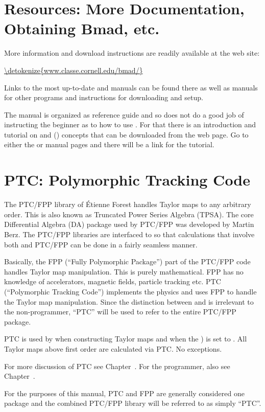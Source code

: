 \section{Resources: More Documentation, Obtaining Bmad, etc.}
\label{s:bmad.web}

More information and download instructions are readily available at the \bmad web site:
\begin{example}
  \url{\detokenize{www.classe.cornell.edu/bmad/}}
\end{example}
Links to the most up-to-date \bmad and \tao manuals can be found there as well as manuals for other
programs and instructions for downloading and setup.

The \bmad manual is organized as reference guide and so does not do a good job of instructing the
beginner as to how to use \bmad. For that there is an introduction and tutorial on \bmad and \tao
() concepts that can be downloaded from the \bmad web page. Go to either the \bmad or
\tao manual pages and there will be a link for the tutorial.

\section{PTC: Polymorphic Tracking Code}
\label{s:ptc.intro}

The PTC/FPP library of \'Etienne Forest handles Taylor maps to any arbitrary order. This is also
known as Truncated Power Series Algebra (TPSA). The core Differential Algebra (DA) package used by
PTC/FPP was developed by Martin Berz\cite{b:berz}. The PTC/FPP libraries are interfaced to \bmad so
that calculations that involve both \bmad and PTC/FPP can be done in a fairly seamless manner.

Basically, the FPP (``Fully Polymorphic Package'') part of the PTC/FPP code handles Taylor map
manipulation. This is purely mathematical. FPP has no knowledge of accelerators, magnetic fields,
particle tracking etc. PTC (``Polymorphic Tracking Code'') implements the physics and uses FPP to
handle the Taylor map manipulation. Since the distinction between  and  is
irrelevant to the non-programmer, ``PTC'' will be used to refer to the entire PTC/FPP package.

PTC is used by \bmad when constructing Taylor maps and when the 
) is set to . All Taylor maps above first order are calculated
via PTC. No exceptions.

For more discussion of PTC see Chapter~. For the programmer, also see
Chapter~.

For the purposes of this manual, PTC and FPP are generally considered one package and
the combined PTC/FPP library will be referred to as simply ``PTC''.

